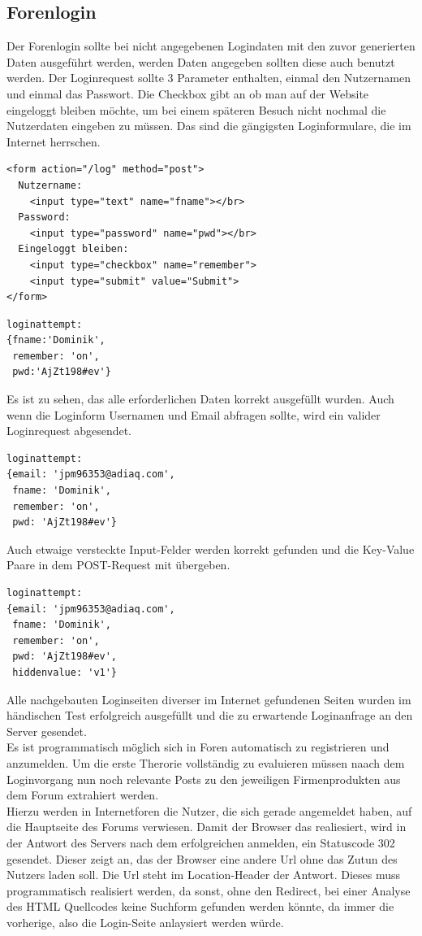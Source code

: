 \subsection{Forenlogin}
Der Forenlogin sollte bei nicht angegebenen Logindaten mit den zuvor generierten Daten ausgeführt werden, werden Daten angegeben sollten diese auch benutzt werden. Der Loginrequest sollte 3 Parameter enthalten, einmal den Nutzernamen und einmal das Passwort. Die Checkbox gibt an ob man auf der Website eingeloggt bleiben möchte, um bei einem späteren Besuch nicht nochmal die Nutzerdaten eingeben zu müssen. Das sind die gängigsten Loginformulare, die im Internet herrschen.
\begin{lstlisting}[language=HTML5]
<form action="/log" method="post">
  Nutzername: 
    <input type="text" name="fname"></br>
  Password: 
    <input type="password" name="pwd"></br>
  Eingeloggt bleiben: 
    <input type="checkbox" name="remember">
    <input type="submit" value="Submit">
</form>
\end{lstlisting}
\begin{lstlisting}[language=HTML5]
loginattempt: 
{fname:'Dominik',
 remember: 'on',
 pwd:'AjZt198#ev'}
\end{lstlisting}
Es ist zu sehen, das alle erforderlichen Daten korrekt ausgefüllt wurden. Auch wenn die Loginform Usernamen und Email abfragen sollte, wird ein valider Loginrequest abgesendet.
\begin{lstlisting}[language=HTML5]
loginattempt:
{email: 'jpm96353@adiaq.com',
 fname: 'Dominik',
 remember: 'on',
 pwd: 'AjZt198#ev'}
\end{lstlisting}
Auch etwaige versteckte Input-Felder werden korrekt gefunden und die Key-Value Paare in dem POST-Request mit übergeben.
\begin{lstlisting}[language=HTML5]
loginattempt:
{email: 'jpm96353@adiaq.com',
 fname: 'Dominik',
 remember: 'on',
 pwd: 'AjZt198#ev',
 hiddenvalue: 'v1'}
\end{lstlisting}
Alle nachgebauten Loginseiten diverser im Internet gefundenen Seiten wurden im händischen Test erfolgreich ausgefüllt und die zu erwartende Loginanfrage an den Server gesendet.\\
Es ist programmatisch möglich sich in Foren automatisch zu registrieren und anzumelden. Um die erste Therorie vollständig zu evaluieren müssen naach dem Loginvorgang nun noch relevante Posts zu den jeweiligen Firmenprodukten aus dem Forum extrahiert werden.\\
Hierzu werden in Internetforen die Nutzer, die sich gerade angemeldet haben, auf die Hauptseite des Forums verwiesen. Damit der Browser das realiesiert, wird in der Antwort des Servers nach dem erfolgreichen anmelden, ein Statuscode 302 gesendet. Dieser zeigt an, das der Browser eine andere Url ohne das Zutun des Nutzers laden soll. Die Url steht im Location-Header der Antwort. Dieses muss programmatisch realisiert werden, da sonst, ohne den Redirect, bei einer Analyse des HTML Quellcodes keine Suchform gefunden werden könnte, da immer die vorherige, also die Login-Seite anlaysiert werden würde.\\
